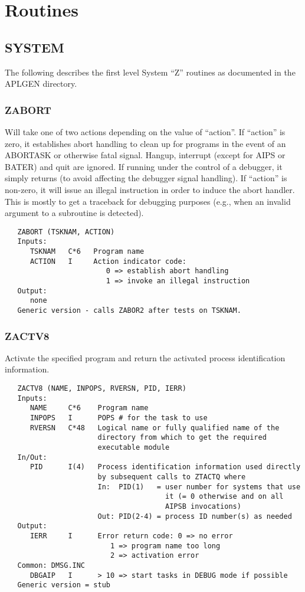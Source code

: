 \section{Routines }

\subsection{SYSTEM}

   The following describes the first level System ``Z'' routines as
documented in the APLGEN directory.

\subsubsection{ZABORT}
Will take one of two actions depending on the value of
``action''.  If ``action'' is zero, it establishes abort handling
to clean up for programs in the event of an ABORTASK or otherwise
fatal signal.  Hangup, interrupt (except for AIPS or BATER) and
quit are ignored.  If running under the control of a debugger, it
simply returns (to avoid affecting the debugger signal handling).
If ``action'' is non-zero, it will issue an illegal instruction in
order to induce the abort handler.  This is mostly to get a
traceback for debugging purposes (e.g., when an invalid argument
to a subroutine is detected).
\begin{verbatim}
   ZABORT (TSKNAM, ACTION)
   Inputs:
      TSKNAM   C*6   Program name
      ACTION   I     Action indicator code:
                        0 => establish abort handling
                        1 => invoke an illegal instruction
   Output:
      none
   Generic version - calls ZABOR2 after tests on TSKNAM.
\end{verbatim}

\subsubsection{ZACTV8}
Activate the specified program and return the activated process
identification information.
\begin{verbatim}
   ZACTV8 (NAME, INPOPS, RVERSN, PID, IERR)
   Inputs:
      NAME     C*6    Program name
      INPOPS   I      POPS # for the task to use
      RVERSN   C*48   Logical name or fully qualified name of the
                      directory from which to get the required
                      executable module
   In/Out:
      PID      I(4)   Process identification information used directly
                      by subsequent calls to ZTACTQ where
                      In:  PID(1)   = user number for systems that use
                                      it (= 0 otherwise and on all
                                      AIPSB invocations)
                      Out: PID(2-4) = process ID number(s) as needed
   Output:
      IERR     I      Error return code: 0 => no error
                         1 => program name too long
                         2 => activation error
   Common: DMSG.INC
      DBGAIP   I      > 10 => start tasks in DEBUG mode if possible
   Generic version = stub
\end{verbatim}

